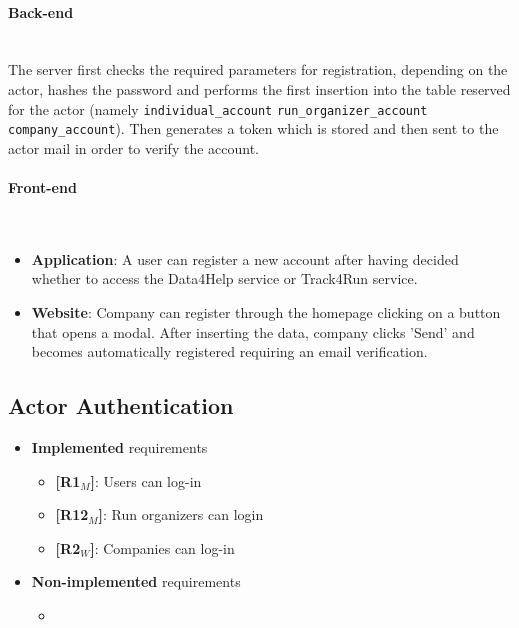 \paragraph{Back-end} \mbox{}\\ 
The server first checks the required parameters for registration, depending on the actor, hashes the password and performs the first insertion into the table reserved for the actor (namely \texttt{individual\_account} \texttt{run\_organizer\_account} \texttt{company\_account}). Then generates a token which is stored and then sent to the actor mail in order to verify the account.
\paragraph{Front-end} \mbox{}\\

\begin{itemize}
    \item \textbf{Application}: A user can register a new account after having decided whether to access the Data4Help service or Track4Run service. 
    \item \textbf{Website}: Company can register through the homepage clicking on a button that opens a modal. After inserting the data, company clicks 'Send' and becomes automatically registered requiring an email verification.
\end{itemize}


\subsection{Actor Authentication}
\begin{itemize}
    \item \textbf{Implemented} requirements
        \begin{itemize}
    \item \textbf{[R1$_M$]}: Users can log-in
    
    \item \textbf{[R12$_M$]}: Run organizers can login
    
    \item \textbf{[R2$_W$]}: Companies can log-in


        \end{itemize}
    \item \textbf{Non-implemented} requirements
    \begin{itemize}
            \item 
        \end{itemize}
\end{itemize}

